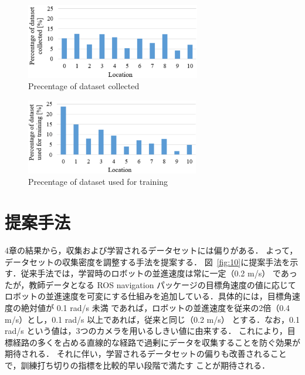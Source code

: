 \documentclass{jarticle}
\renewcommand{\figurename}{図~}
\newcommand{\figref}[1]{\figurename\ref{#1}}
\begin{document}
\begin{figure}[h!]
  \centering
   \includegraphics[height=33mm]{./pdf/set2.pdf}
   \caption{Precentage of dataset collected}
   \label{fig:8}
\end{figure}



\begin{figure}[h!]
  \centering
   \includegraphics[height=33mm]{./pdf/gaku2.pdf}
   \caption{Precentage of dataset used for training}
   \label{fig:9}
\end{figure}


\section{提案手法}
4章の結果から，収集および学習されるデータセットには偏りがある．
よって，データセットの収集密度を調整する手法を提案する．
\figref{fig:10}に提案手法を示す．従来手法では，学習時のロボットの並進速度は常に一定（0.2 m/s）
であったが，教師データとなる ROS navigation パッケージの目標角速度の値に応じて
ロボットの並進速度を可変にする仕組みを追加している．具体的には，目標角速度の絶対値が 0.1 rad/s 未満
であれば，ロボットの並進速度を従来の2倍（0.4 m/s）とし，0.1 rad/s 以上であれば，従来と同じ（0.2 m/s）
とする．なお，0.1 rad/s という値は，3つのカメラを用いるしきい値に由来する．
これにより，目標経路の多くを占める直線的な経路で過剰にデータを収集することを防ぐ効果が期待される．
それに伴い，学習されるデータセットの偏りも改善されることで，訓練打ち切りの指標を比較的早い段階で満たす
ことが期待される．
\end{document}
